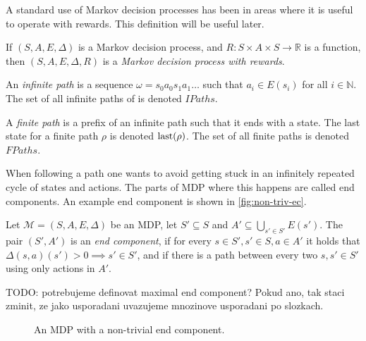 A standard use of Markov decision processes has been in areas where it
is useful to operate with rewards. This definition will be useful later.

\begin{definition}
If $(S, A, E, \Delta)$ is a Markov decision process,
and $R : S \times A \times S \to \mathbb{R}$ is a function,
then $(S,A,E,\Delta,R)$ is a {\em Markov decision process with rewards}.
\end{definition}


\begin{definition}[Path]
    An {\em infinite path} is
    a sequence $\omega = s_0 a_0 s_1 a_1
    \ldots$ such that $a_i \in E(s_i)$ for all $i \in \mathbb{N}$.
    The set of all infinite paths of is denoted $IPaths$.

    A {\em finite path} is a prefix of an infinite path such that it
    ends with a state. The last state for a finite path $\rho$ is
    denoted $\operatorname{last}(\rho)$. The set of all finite paths is denoted
    $FPaths$.
\end{definition}

When following a path one wants to avoid getting stuck in
an infinitely repeated cycle of states and actions. The parts of MDP
where this happens are called end components.
An example end component is shown in \autoref{fig:non-triv-ec}.

\begin{definition}
Let $\mathcal{M} = (S, A, E, \Delta)$ be an MDP,
let $S' \subseteq S$ and $A' \subseteq \bigcup_{s' \in S'} E(s')$.
The pair $(S', A')$ is an {\em end component},
if for every $s \in S', s' \in S, a \in A'$ it holds that
$\Delta(s,a)(s') > 0 \implies s' \in S'$,
and if there is a path between every two $s, s' \in S'$
using only actions in $A'$.
\end{definition}

TODO: potrebujeme definovat maximal end component? Pokud ano, tak staci
zminit, ze jako usporadani uvazujeme mnozinove usporadani po slozkach.

\begin{figure}[ht]
\begin{center}
\end{center}
\caption{An MDP with a non-trivial end component.}
\label{fig:non-triv-ec}
\end{figure}


